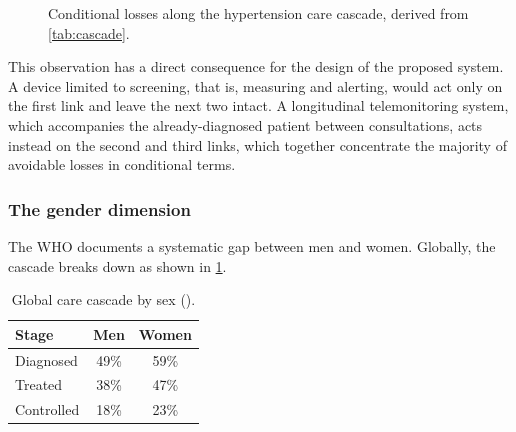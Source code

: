 \documentclass[12pt,a4paper,oneside]{report}
\begin{document}
\begin{figure}[htbp]
\centering
{}
\caption{Conditional losses along the hypertension care cascade, derived from \cref{tab:cascade}.}\label{fig:losses}
\end{figure}

This observation has a direct consequence for the design of the proposed system. A device limited to screening, that is, measuring and alerting, would act only on the first link and leave the next two intact. A longitudinal telemonitoring system, which accompanies the already-diagnosed patient between consultations, acts instead on the second and third links, which together concentrate the majority of avoidable losses in conditional terms.

\subsubsection{The gender dimension}

The WHO \parencite{who2023hypertension} documents a systematic gap between men and women. Globally, the cascade breaks down as shown in \cref{tab:gender}.

\begin{table}[htbp]
\centering\small
\caption{Global care cascade by sex (\cite{who2023hypertension}).}\label{tab:gender}
\begin{tabular}{@{}lcc@{}}
\toprule
\textbf{Stage} & \textbf{Men} & \textbf{Women} \\
\midrule
Diagnosed & 49\% & 59\% \\
Treated & 38\% & 47\% \\
Controlled & 18\% & 23\% \\
\bottomrule
\end{tabular}
\end{table}
\end{document}
